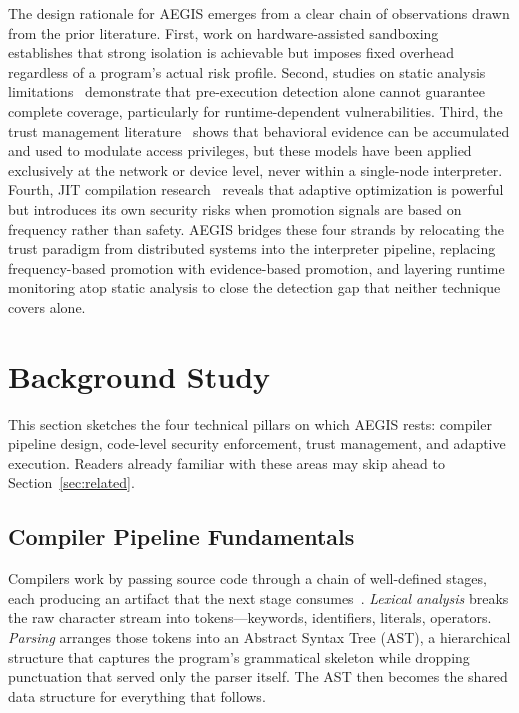 \documentclass[conference]{IEEEtran}
\begin{document}
The design rationale for AEGIS emerges from a clear chain of
observations drawn from the prior literature. First, work on
hardware-assisted sandboxing~\cite{johnson2023wave,menetrey2024sgx}
establishes that strong isolation is achievable but imposes fixed
overhead regardless of a program's actual risk profile. Second,
studies on static analysis limitations~\cite{ami2024false_neg,huang2024static}
demonstrate that pre-execution detection alone cannot guarantee
complete coverage, particularly for runtime-dependent
vulnerabilities. Third, the trust management
literature~\cite{wang2022trust,li2022iot_trust,ullah2024deeptrust}
shows that behavioral evidence can be accumulated and used to
modulate access privileges, but these models have been applied
exclusively at the network or device level, never within a
single-node interpreter. Fourth, JIT compilation
research~\cite{qin2022jit_security,chen2024jit_val} reveals that
adaptive optimization is powerful but introduces its own security
risks when promotion signals are based on frequency rather than
safety. AEGIS bridges these four strands by relocating the trust
paradigm from distributed systems into the interpreter pipeline,
replacing frequency-based promotion with evidence-based promotion,
and layering runtime monitoring atop static analysis to close the
detection gap that neither technique covers alone.

\section{Background Study}
\label{sec:background}

This section sketches the four technical pillars on which AEGIS
rests: compiler pipeline design, code-level security enforcement,
trust management, and adaptive execution.  Readers already
familiar with these areas may skip ahead to
Section~\ref{sec:related}.

\subsection{Compiler Pipeline Fundamentals}

Compilers work by passing source code through a chain of
well-defined stages, each producing an artifact that the next
stage consumes~\cite{aho2007compilers}.  \emph{Lexical analysis}
breaks the raw character stream into tokens---keywords,
identifiers, literals, operators.  \emph{Parsing} arranges
those tokens into an Abstract Syntax Tree (AST), a hierarchical
structure that captures the program's grammatical skeleton while
dropping punctuation that served only the parser itself.  The
AST then becomes the shared data structure for everything that
follows.
\end{document}
